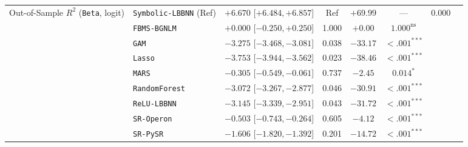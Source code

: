 \begin{table}[htbp]
{{\begin{tabular}{llcccccc}
\midrule
Out-of-Sample $R^2$ (\texttt{Beta}, logit) & \texttt{Symbolic-LBBNN} (Ref) & $+6.670$ [$+6.484, +6.857$] & Ref & $+69.99$ & --- & 0.000 \\
 & \texttt{FBMS-BGNLM} & $+0.000$ [$-0.250, +0.250$] & 1.000 & $+0.00$ & $1.000^{\text{ns}}$ &  \\
 & \texttt{GAM} & $-3.275$ [$-3.468, -3.081$] & 0.038 & $-33.17$ & $<.001^{***}$ &  \\
 & \texttt{Lasso} & $-3.753$ [$-3.944, -3.562$] & 0.023 & $-38.46$ & $<.001^{***}$ &  \\
 & \texttt{MARS} & $-0.305$ [$-0.549, -0.061$] & 0.737 & $-2.45$ & $0.014^{*}$ &  \\
 & \texttt{RandomForest} & $-3.072$ [$-3.267, -2.877$] & 0.046 & $-30.91$ & $<.001^{***}$ &  \\
 & \texttt{ReLU-LBBNN} & $-3.145$ [$-3.339, -2.951$] & 0.043 & $-31.72$ & $<.001^{***}$ &  \\
 & \texttt{SR-Operon} & $-0.503$ [$-0.743, -0.264$] & 0.605 & $-4.12$ & $<.001^{***}$ &  \\
 & \texttt{SR-PySR} & $-1.606$ [$-1.820, -1.392$] & 0.201 & $-14.72$ & $<.001^{***}$ &  \\
\bottomrule
\end{tabular}%
}
}
\end{table}

